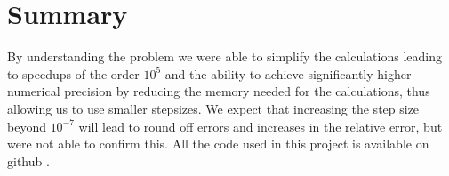 \section*{Summary}

By understanding the problem we were able to simplify the
calculations leading to speedups of the order $10^5$ and the ability to achieve
significantly higher numerical precision by reducing the memory
needed for the calculations, thus allowing us to use smaller stepsizes.
We expect that increasing the step size beyond $10^{-7}$ will lead to round off
errors and increases in the relative error, but were not able to confirm this.
All the code used in this project is available on github \cite{github}.
